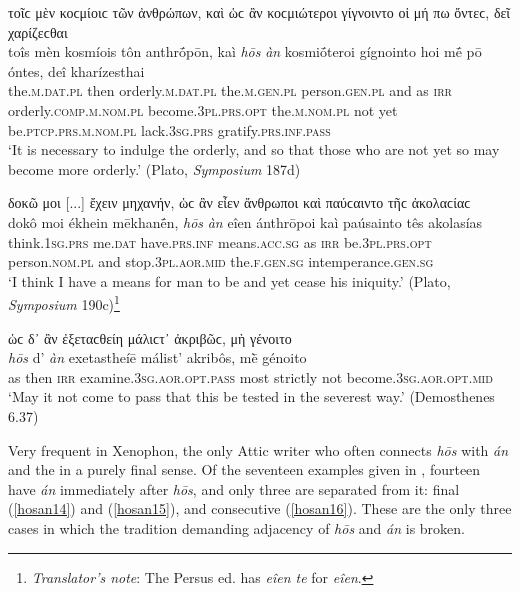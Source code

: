\begin{exe}
\ex τοῖϲ μὲν κοϲμίοιϲ τῶν ἀνθρώπων, καὶ ὡϲ ἂν κοϲμιώτεροι γίγνοιντο οἱ μή πω ὄντεϲ, δεῖ χαρίζεϲθαι\\
\gll toîs mèn kosmíois tôn anthrṓpōn, kaì \emph{hōs} \emph{àn} kosmiṓteroi gígnointo hoi mḗ pō óntes, deî kharízesthai\\
the.\textsc{m.dat.pl} then orderly.\textsc{m.dat.pl} the.\textsc{m.gen.pl} person.\textsc{gen.pl} and as \textsc{irr} orderly.\textsc{comp.m.nom.pl} become.\textsc{3pl.prs.opt} the.\textsc{m.nom.pl} not yet be.\textsc{ptcp.prs.m.nom.pl} lack.\textsc{3sg.prs} gratify.\textsc{prs.inf.pass}\\
\trans `It is necessary to indulge the orderly, and so that those who are not yet so may become more orderly.' (Plato, \textit{Symposium} 187d)
\label{hosan11}
\end{exe}

\begin{exe}
\ex δοκῶ μοι {[}...{]} ἔχειν μηχανήν, ὡϲ ἂν εἶεν ἄνθρωποι καὶ παύϲαιντο τῆϲ ἀκολαϲίαϲ\\
\gll dokô moi ékhein mēkhanḗn, \emph{hōs} \emph{àn} eîen ánthrōpoi kaì paúsainto tês akolasías\\ 
think.\textsc{1sg.prs} me.\textsc{dat} have.\textsc{prs.inf} means.\textsc{acc.sg} as \textsc{irr} be.\textsc{3pl.prs.opt} person.\textsc{nom.pl} and stop.\textsc{3pl.aor.mid} the.\textsc{f.gen.sg} intemperance.\textsc{gen.sg}\\
\trans `I think I have a means for man to be and yet cease his iniquity.' (Plato, \textit{Symposium} 190c)\footnote{\emph{Translator's note}: The Persus ed. has \textit{eîen te} for \textit{eîen}.}
\label{hosan12}
\end{exe}

\begin{exe}
\ex ὡϲ δ᾽ ἂν ἐξεταϲθείη μάλιϲτ᾽ ἀκριβῶϲ, μὴ γένοιτο\\
\gll \emph{hōs} d' \emph{àn} exetastheíē málist' akribôs, mḕ génoito\\
as then \textsc{irr} examine.\textsc{3sg.aor.opt.pass} most strictly not become.\textsc{3sg.aor.opt.mid}\\
\trans `May it not come to pass that this be tested in the severest way.' (Demosthenes 6.37)
\label{hosan13}
\end{exe}

Very frequent in Xenophon, the only Attic  writer who often connects \emph{hōs} with \emph{án} and the  in a purely final sense. Of the seventeen examples given in \citet[83ff.]{Weber1885}, fourteen have \emph{án} immediately after \emph{hōs}, and only three are separated from it: final (\ref{hosan14}) and (\ref{hosan15}), and consecutive (\ref{hosan16}). These are the only three cases in which the tradition demanding adjacency of \emph{hōs} and \emph{án} is broken.


